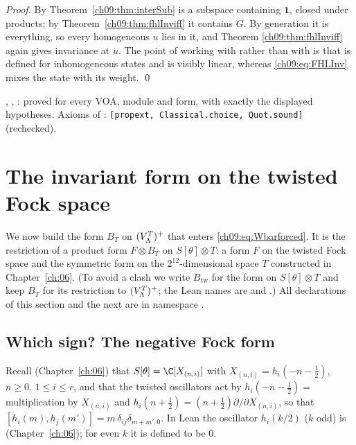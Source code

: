 \noindent\emph{Proof.} By Theorem~\ref{ch09:thm:interSub}  is a subspace containing
$\mathbf1$, closed under products; by Theorem~\ref{ch09:thm:fhlInviff} it contains $G$. By
generation it is everything, so every homogeneous $u$ lies in it, and Theorem
\ref{ch09:thm:fhlInviff} again gives invariance at $u$. The point of working with
 rather than with  is that  is defined for
inhomogeneous states and is visibly linear, whereas \eqref{ch09:eq:FHLInv} mixes the state with
its weight. \qed

\begin{status}
, , : proved for every VOA,
module and form, with exactly the displayed hypotheses. Axioms of :
\texttt{[propext, Classical.choice, Quot.sound]} (rechecked).
\end{status}

\section{The invariant form on the twisted Fock space}\label{ch09:sec:fock}

We now build the form $B_T$ on $(V_{\Lambda}^{T})^{+}$ that enters \eqref{ch09:eq:Wbarforced}. It is the
restriction of a product form $F\otimes B_{T}$ on $S[\theta]\otimes T$: a form $F$ on the twisted
Fock space and the symmetric form  on the $2^{12}$-dimensional space $T$ constructed
in Chapter~\ref{ch:06}. (To avoid a clash we write $B_{\mathrm{tw}}$ for the form on
$S[\theta]\otimes T$ and keep $B_T$ for its restriction to $(V_{\Lambda}^{T})^{+}$; the Lean names are
 and .) All declarations of this section and the next are in
namespace .

\subsection{Which sign? The negative Fock form}

Recall (Chapter~\ref{ch:06}) that $S[\theta]=\C[X_{(n,i)}]$ with $X_{(n,i)}=h_i(-n-\frac12)$,
$n\ge0$, $1\le i\le r$, and that the twisted oscillators act by
$h_i(-n-\tfrac12)=$ multiplication by $X_{(n,i)}$ and $h_i(n+\tfrac12)=(n+\tfrac12)\partial/\partial X_{(n,i)}$,
so that $[h_i(m),h_j(m')]=m\,\delta_{ij}\delta_{m+m',0}$. In Lean the oscillator $h_i(k/2)$ ($k$ odd)
is  (Chapter~\ref{ch:06}); for even $k$ it is defined to be $0$.

